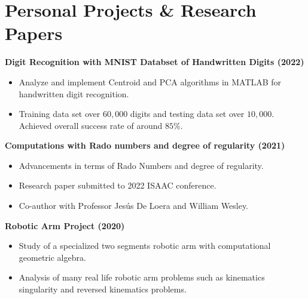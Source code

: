\section{\sc Personal Projects \& Research Papers}

{\bf{Digit Recognition with MNIST Databset of Handwritten Digits} (2022)}\\
\begin{itemize}
\setlength\itemsep{0em}
\item Analyze and implement Centroid and PCA algorithms in MATLAB for handwritten digit recognition. 
\item Training data set over $60,000$ digits and testing data set over $10,000$. Achieved overall success rate of around $85\%$.
\end{itemize}

{\bf{Computations with Rado numbers and degree of regularity} (2021)}\\
\begin{itemize}
\setlength\itemsep{0em}
\item Advancements in terms of Rado Numbers and degree of regularity.
\item Research paper submitted to 2022 ISAAC conference.
\item Co-author with Professor Jes\'{u}s De Loera and William Wesley.
\end{itemize}


{\bf{Robotic Arm Project} (2020)}\\
\begin{itemize}
\setlength\itemsep{0em}
\item Study of a specialized two segments robotic arm with computational geometric algebra.
\item Analysis of many real life robotic arm problems such as kinematics singularity and reversed kinematics problems. 
\end{itemize}


